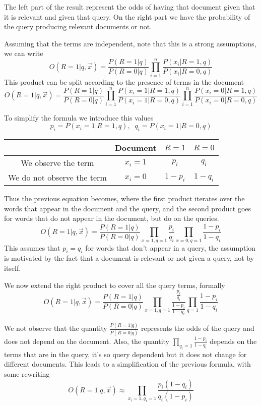 The left part of the result represent the odds of having that document 
given that it is relevant and given that query. On the right part we 
have the probability of the query producing relevant documents or not.

Assuming that the terms are independent, note that this is a strong assumptions, 
we can write
$$O(R=1| q, \vec{x}) = \frac{P(R=1|q)}{P(R=0|q)} \prod_{i=1}^{n} 
\frac{P(x_i|R=1, q)}{P(x_i|R=0, q)}$$ 
This product can be split according to the presence of terms in the document
$$O(R=1| q, \vec{x}) = \frac{P(R=1|q)}{P(R=0|q)} \prod_{i=1}^{n} 
\frac{P(x_i = 1|R=1, q)}{P(x_i = 1|R=0, q)} \prod_{i=1}^{n} 
\frac{P(x_i = 0|R=1, q)}{P(x_i = 0|R=0, q)}$$ 

To simplify the formula we introduce this values
$$p_i = P(x_i = 1|R=1, q), \;\; q_i = P(x_i = 1|R=0, q)$$
\begin{center}
    \begin{tabular}{c | c |c | c}
        & Document & $R=1$ & $R=0$\\
        \hline
        We observe the term & $x_i = 1$ & $p_i$ & $q_i$\\
        \hline
        We do not observe the term & $x_i = 0$ & $1- p_i$ & $1- q_i$
    \end{tabular}
\end{center}
Thus the previous equation becomes, where the first product iterates
over the words that appear in the document and the query, 
and the second product goes for words that do not appear in the document, 
but do on the queries. 
$$O(R=1| q, \vec{x}) = \frac{P(R=1|q)}{P(R=0|q)} \prod_{x=1, q=1} 
\frac{p_i}{q_i} \prod_{x=0, q=1} 
\frac{1- p_i}{1- q_i}$$ 
This assumes that $p_i = q_i$ for words that 
don't appear in a query, the assumption is motivated by the fact that a document
is relevant or not given a query, not by itself.

We now extend the right product to cover all the query terms, 
formally 
$$O(R=1| q, \vec{x}) = \frac{P(R=1|q)}{P(R=0|q)} \prod_{x=1, q=1} 
\frac{\frac{p_i}{q_i}}{\frac{1 - p_i}{1-q_i}} \prod_{q=1} 
\frac{1- p_i}{1- q_i}$$ 

We not observe that the quantity 
$\frac{P(R=1|q)}{P(R=0|q)}$ represents the odds of the query and does not 
depend on the document.
Also, the quantity $\prod_{q_i = 1} \frac{1- p_i}{1-q_i}$ depends on the terms 
that are in the query, it's so query dependent but it does not change 
for different documents.
This leads to a simplification of the previous formula, with some rewriting
$$O(R=1|q, \vec{x}) \approx \prod_{x_i=1, q_i = 1} 
\frac{p_i(1-q_i)}{q_i(1-p_i)}$$

